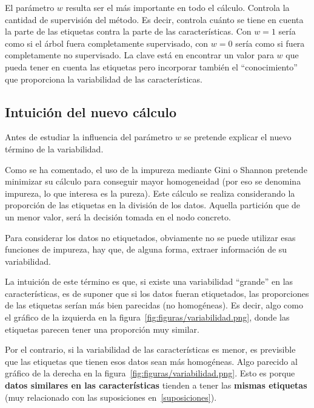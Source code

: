 El parámetro $w$ resulta ser el más importante en todo el cálculo. Controla la cantidad de supervisión del método. Es decir, controla cuánto se tiene en cuenta la parte de las etiquetas contra la parte de las características. Con $w = 1$ sería como si el árbol fuera completamente supervisado, con $w = 0$ sería como si fuera completamente no supervisado. La clave está en encontrar un valor para $w$ que pueda tener en cuenta las etiquetas pero incorporar también el ``conocimiento'' que proporciona la variabilidad de las características.

\subsection{Intuición del nuevo cálculo}

Antes de estudiar la influencia del parámetro $w$ se pretende explicar el nuevo término de la variabilidad.


Como se ha comentado, el uso de la impureza mediante Gini o Shannon pretende minimizar su cálculo para conseguir mayor homogeneidad (por eso se denomina impureza, lo que interesa es la pureza). Este cálculo se realiza considerando la proporción de las etiquetas en la división de los datos. Aquella partición que de un menor valor, será la decisión tomada en el nodo concreto.

Para considerar los datos no etiquetados, obviamente no se puede utilizar esas funciones de impureza, hay que, de alguna forma, extraer información de su variabilidad. 

La intuición de este término es que, si existe una variabilidad ``grande'' en las características, es de suponer que si los datos fueran etiquetados, las proporciones de las etiquetas serían más bien parecidas (no homogéneas). Es decir, algo como el gráfico de la izquierda en la figura~\ref{fig:figuras/variabilidad.png}, donde las etiquetas parecen tener una proporción muy similar.

Por el contrario, si la variabilidad de las características es menor, es previsible que las etiquetas que tienen esos datos sean más homogéneas. Algo parecido al gráfico de la derecha en la figura~\ref{fig:figuras/variabilidad.png}. Esto es porque \textbf{datos similares en las características} tienden a tener las \textbf{mismas etiquetas} (muy relacionado con las suposiciones en~\ref{suposiciones}).

